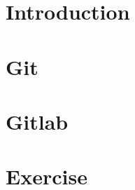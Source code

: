 \documentclass{IEECSlides}
\begin{document}




\section{Introduction}



\section{Git}



\section{Gitlab}



\section{Exercise}


\end{document}
